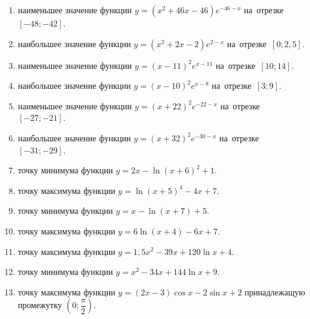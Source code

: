 \documentclass[a4paper,10pt]{article}
\begin{document}
\begin{enumerate}
\item {} наименьшее значение функции $y=\left(x^2 +46x -46\right)e^{-46-x}$ на~отрезке~$\left[-48;-42\right]$.

\item {} наибольшее значение функции $y=\left(x^2 +2x -2\right)e^{2-x}$ на~отрезке~$\left[0;2,5\right]$.

\item {} наименьшее значение функции $y=\left(x-11\right)^2e^{x-11}$ на~отрезке~$\left[10;14\right]$.

\item {} наибольшее значение функции $y=\left(x-10\right)^2e^{x-8}$ на~отрезке~$\left[3;9\right]$.

\item {} наименьшее значение функции $y=\left(x+22\right)^2e^{-22-x}$ на~отрезке~$\left[-27;-21\right]$.

\item {} наибольшее значение функции $y=\left(x+32\right)^2e^{-30-x}$ на~отрезке~$\left[-31;-29\right]$.

\item {} точку минимума функции $y=2x-\ln\left(x+6\right)^{2}+1$.

\item {} точку максимума функции $y=\ln\left(x+5\right)^{4}-4x+7$.

\item {} точку минимума функции $y=x-\ln\left(x+7\right)+5$.







\item {} точку максимума функции $y=6\ln\left(x+4\right)-6x+7$.







\item {} точку максимума функции $y=1,5x^2-39x+120\ln x +4$.

\item {} точку минимума функции $y=x^2-34x+144\ln x +9$.

\item {} точку максимума функции $y=\left(2x-3\right)\cos x -2\sin x+2$
принадлежащую промежутку $\left(0;\dfrac{\pi}{2}\right)$.


\end{enumerate}
\end{document}
